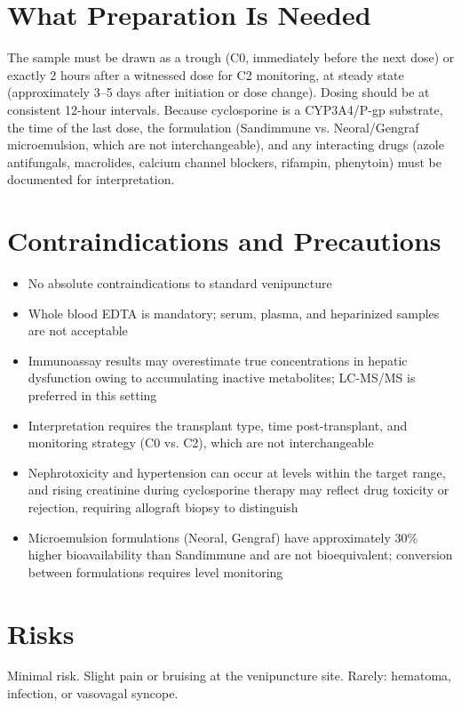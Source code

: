 \section*{What Preparation Is Needed}
The sample must be drawn as a trough (C0, immediately before the next dose) or exactly 2 hours after a witnessed dose for C2 monitoring, at steady state (approximately 3--5 days after initiation or dose change). Dosing should be at consistent 12-hour intervals. Because cyclosporine is a CYP3A4/P-gp substrate, the time of the last dose, the formulation (Sandimmune vs. Neoral/Gengraf microemulsion, which are not interchangeable), and any interacting drugs (azole antifungals, macrolides, calcium channel blockers, rifampin, phenytoin) must be documented for interpretation.

\section*{Contraindications and Precautions}
\begin{itemize}
  \item No absolute contraindications to standard venipuncture
  \item Whole blood EDTA is mandatory; serum, plasma, and heparinized samples are not acceptable
  \item Immunoassay results may overestimate true concentrations in hepatic dysfunction owing to accumulating inactive metabolites; LC-MS/MS is preferred in this setting
  \item Interpretation requires the transplant type, time post-transplant, and monitoring strategy (C0 vs. C2), which are not interchangeable
  \item Nephrotoxicity and hypertension can occur at levels within the target range, and rising creatinine during cyclosporine therapy may reflect drug toxicity or rejection, requiring allograft biopsy to distinguish
  \item Microemulsion formulations (Neoral, Gengraf) have approximately 30\% higher bioavailability than Sandimmune and are not bioequivalent; conversion between formulations requires level monitoring
\end{itemize}

\section*{Risks}
Minimal risk. Slight pain or bruising at the venipuncture site. Rarely: hematoma, infection, or vasovagal syncope.

